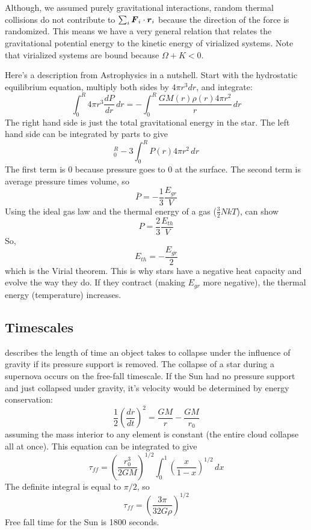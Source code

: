 Although, we assumed purely gravitational interactions, random thermal collisions
do not contribute to $\sum_i\boldsymbol F_i\cdot\boldsymbol r_i$ because the direction of the force is
randomized.  This means we have a very general relation that relates the gravitational potential
energy to the kinetic energy of virialized systems.  Note that virialized systems are
bound because $\Omega+K < 0$.

Here's a description from Astrophysics in a nutshell.  
Start with the hydrostatic equilibrium equation, multiply both sides by $4\pi r^3dr$, and integrate:
\begin{equation}
\int_0^R4\pi r^3\frac{dP}{dr}\,dr = -\int_0^R\frac{GM(r)\rho (r)4\pi r^2}{r}\,dr
\end{equation}
The right hand side is just the total gravitational energy in the star.  The left hand side 
can be integrated by parts to give
\begin{equation}
[P(r)4\pi r^3]_0^R-3\int_0^RP(r)4\pi r^2\,dr
\end{equation}
The first term is 0 because pressure goes to 0 at the surface.  The second term is average 
pressure times volume, so 
\begin{equation}
\bar{P}=-\frac{1}{3}\frac{E_{gr}}{V}
\end{equation}
Using the ideal gas law and the thermal energy of a gas ($\frac{3}{2}NkT$), can show
\begin{equation}
P=\frac{2}{3}\frac{E_{th}}{V}
\end{equation}
So, 
\begin{equation}
\boxed{E_{th}=-\frac{E_{gr}}{2}}
\end{equation}
which is the Virial theorem.  This is why stars have a negative heat capacity and evolve the way 
they do.  If they contract (making $E_{gr}$ more negative), the thermal energy (temperature) 
increases.


\subsection{Timescales}
 describes the length of time an object takes to collapse
under the influence of gravity if its pressure support is removed.  The collapse of a star
during a supernova occurs on the free-fall timescale.
If the Sun had no pressure support and just collapsed under gravity, it's velocity would be 
determined by energy conservation:
\begin{equation}
\frac{1}{2}\left(\frac{dr}{dt}\right)^2 = \frac{GM}{r}-\frac{GM}{r_0}
\end{equation}
assuming the mass interior to any element is constant (the entire cloud collapse all at once).
This equation can be integrated to give
\begin{equation}
\tau_{ff}=\left(\frac{r_0^3}{2GM}\right)^{1/2}\int_0^1\left(\frac{x}{1-x}\right)^{1/2}\,dx
\end{equation}
The definite integral is equal to $\pi/2$, so
\begin{equation}\boxed{
\tau_{ff}=\left(\frac{3\pi}{32G\rho}\right)^{1/2}
}\end{equation}
Free fall time for the Sun is 1800 seconds.

